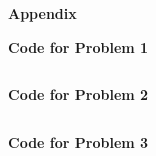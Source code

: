 \documentclass[12pt]{article}
\begin{document}
\pagebreak

{\large\textbf{Appendix}}

\textbf{Code for Problem 1}

\begin{lstlisting}[language=R]
\end{lstlisting}

\pagebreak

\textbf{Code for Problem 2}

\begin{lstlisting}[language=R]
\end{lstlisting}


\pagebreak

\textbf{Code for Problem 3}

\begin{lstlisting}[language=R]
\end{lstlisting}
\end{document}
